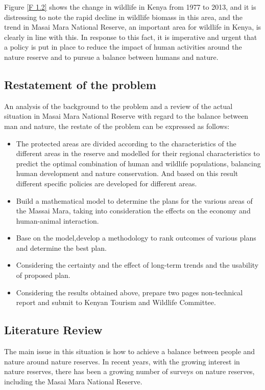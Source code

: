 \documentclass{mcmthesis}
\numberwithin{figure}{section}
\numberwithin{table}{section}
\numberwithin{equation}{section}
\begin{document}
Figure \ref{F 1.2} shows the change in wildlife in Kenya from 1977 to 2013, and it is distressing to note the rapid decline in wildlife biomass in this area, and the trend in Masai Mara National Reserve, an important area for wildlife in Kenya, is clearly in line with this. In response to this fact, it is imperative and urgent that a policy is put in place to reduce the impact of human activities around the nature reserve and to pursue a balance between humans and nature.

\subsection{Restatement of the problem}

An analysis of the background to the problem and a review of the actual situation in Masai Mara National Reserve with regard to the balance between man and nature, the restate of the problem can be expressed as follows:
\begin{itemize}
	\item[\ding{212}] The protected areas are divided according to the characteristics of the different areas in the reserve and modelled for their regional characteristics to predict the optimal combination of human and wildlife populations, balancing human development and nature conservation. And based on this result different specific policies are developed for different areas.
    \item[\ding{212}] Build a mathematical model to determine the plans for the various areas of the Massai Mara, taking into consideration the effects on the economy and human-animal interaction.
	\item[\ding{212}] Base on the model,develop a methodology to rank outcomes of various plans and determine the best plan.
	\item[\ding{212}] Considering the certainty and the effect of long-term trends and the usability of proposed plan.
    \item[\ding{212}] Considering the results obtained above, prepare two pages non-technical report and submit to Kenyan Tourism and Wildlife Committee.
\end{itemize}

\subsection{Literature Review}

The main issue in this situation is how to achieve a balance between people and nature around nature reserves. In recent years, with the growing interest in nature reserves, there has been a growing number of surveys on nature reserves, including the Masai Mara National Reserve.
\end{document}
